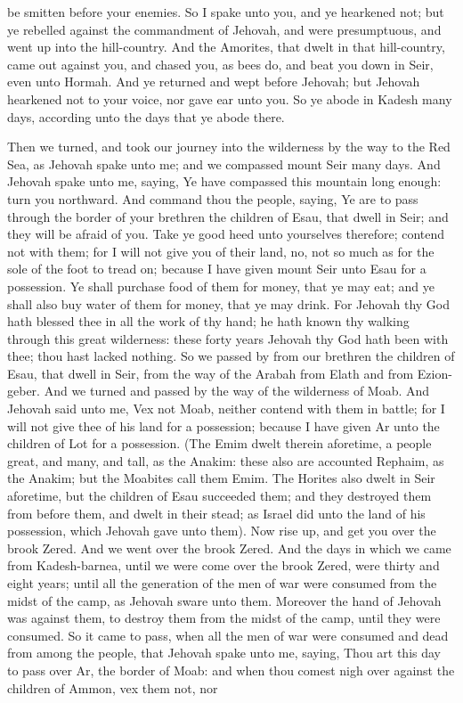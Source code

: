 be smitten before your enemies. So I spake unto you, and ye hearkened not; but ye rebelled against the commandment of Jehovah, and were presumptuous, and went up into the hill-country. And the Amorites, that dwelt in that hill-country, came out against you, and chased you, as bees do, and beat you down in Seir, even unto Hormah. And ye returned and wept before Jehovah; but Jehovah hearkened not to your voice, nor gave ear unto you. So ye abode in Kadesh many days, according unto the days that ye abode there. 

Then we turned, and took our journey into the wilderness by the way to the Red Sea, as Jehovah spake unto me; and we compassed mount Seir many days. And Jehovah spake unto me, saying, Ye have compassed this mountain long enough: turn you northward. And command thou the people, saying, Ye are to pass through the border of your brethren the children of Esau, that dwell in Seir; and they will be afraid of you. Take ye good heed unto yourselves therefore; contend not with them; for I will not give you of their land, no, not so much as for the sole of the foot to tread on; because I have given mount Seir unto Esau for a possession. Ye shall purchase food of them for money, that ye may eat; and ye shall also buy water of them for money, that ye may drink. For Jehovah thy God hath blessed thee in all the work of thy hand; he hath known thy walking through this great wilderness: these forty years Jehovah thy God hath been with thee; thou hast lacked nothing. So we passed by from our brethren the children of Esau, that dwell in Seir, from the way of the Arabah from Elath and from Ezion-geber. And we turned and passed by the way of the wilderness of Moab. And Jehovah said unto me, Vex not Moab, neither contend with them in battle; for I will not give thee of his land for a possession; because I have given Ar unto the children of Lot for a possession. (The Emim dwelt therein aforetime, a people great, and many, and tall, as the Anakim: these also are accounted Rephaim, as the Anakim; but the Moabites call them Emim. The Horites also dwelt in Seir aforetime, but the children of Esau succeeded them; and they destroyed them from before them, and dwelt in their stead; as Israel did unto the land of his possession, which Jehovah gave unto them). Now rise up, and get you over the brook Zered. And we went over the brook Zered. And the days in which we came from Kadesh-barnea, until we were come over the brook Zered, were thirty and eight years; until all the generation of the men of war were consumed from the midst of the camp, as Jehovah sware unto them. Moreover the hand of Jehovah was against them, to destroy them from the midst of the camp, until they were consumed.  So it came to pass, when all the men of war were consumed and dead from among the people, that Jehovah spake unto me, saying, Thou art this day to pass over Ar, the border of Moab: and when thou comest nigh over against the children of Ammon, vex them not, nor 